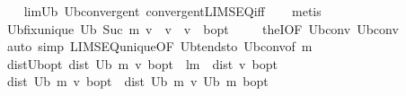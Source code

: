 \begin{isabellebody}
%
\isadelimproof
\ \ %
\endisadelimproof
%
\isatagproof
{}\isamarkupfalse%
\ lim{\isacharunderscore}{\kern0pt}U\isactrlsub b\ U\isactrlsub b{\isacharunderscore}{\kern0pt}convergent\ convergent{\isacharunderscore}{\kern0pt}LIMSEQ{\isacharunderscore}{\kern0pt}iff\isanewline
\ \ \isamarkupfalse%
\ metis%
\endisatagproof
{\isafoldproof}%
%
\isadelimproof
\isanewline
%
\endisadelimproof
\isanewline
{}\isamarkupfalse%
\ U\isactrlsub b{\isacharunderscore}{\kern0pt}fix{\isacharunderscore}{\kern0pt}unique{\isacharcolon}{\kern0pt}\ {\isachardoublequoteopen}U\isactrlsub b\ {\isacharparenleft}{\kern0pt}Suc\ m{\isacharparenright}{\kern0pt}\ v\ {\isacharequal}{\kern0pt}\ v\ {\isasymlongleftrightarrow}\ v\ {\isacharequal}{\kern0pt}\ {\isasymnu}\isactrlsub b{\isacharunderscore}{\kern0pt}opt{\isachardoublequoteclose}\ \isanewline
%
\isadelimproof
\ \ %
\endisadelimproof
%
\isatagproof
{}\isamarkupfalse%
\ theI{\isacharprime}{\kern0pt}{\isacharbrackleft}{\kern0pt}OF\ U\isactrlsub b{\isacharunderscore}{\kern0pt}conv{\isacharparenleft}{\kern0pt}{}{\isacharparenright}{\kern0pt}{\isacharbrackright}{\kern0pt}\ U\isactrlsub b{\isacharunderscore}{\kern0pt}conv{\isacharparenleft}{\kern0pt}{}{\isacharparenright}{\kern0pt}\isanewline
\ \ \isamarkupfalse%
\ {\isacharparenleft}{\kern0pt}auto\ simp{\isacharcolon}{\kern0pt}\ LIMSEQ{\isacharunderscore}{\kern0pt}unique{\isacharbrackleft}{\kern0pt}OF\ U\isactrlsub b{\isacharunderscore}{\kern0pt}tendsto\ U\isactrlsub b{\isacharunderscore}{\kern0pt}conv{\isacharparenleft}{\kern0pt}{}{\isacharparenright}{\kern0pt}{\isacharbrackleft}{\kern0pt}of\ m{\isacharbrackright}{\kern0pt}{\isacharbrackright}{\kern0pt}{\isacharparenright}{\kern0pt}%
\endisatagproof
{\isafoldproof}%
%
\isadelimproof
\isanewline
%
\endisadelimproof
\isanewline
{}\isamarkupfalse%
\ dist{\isacharunderscore}{\kern0pt}U\isactrlsub b{\isacharunderscore}{\kern0pt}opt{\isacharcolon}{\kern0pt}\ {\isachardoublequoteopen}dist\ {\isacharparenleft}{\kern0pt}U\isactrlsub b\ m\ v{\isacharparenright}{\kern0pt}\ {\isasymnu}\isactrlsub b{\isacharunderscore}{\kern0pt}opt\ {\isasymle}\ l{\isacharcircum}{\kern0pt}m\ {\isacharasterisk}{\kern0pt}\ dist\ v\ {\isasymnu}\isactrlsub b{\isacharunderscore}{\kern0pt}opt{\isachardoublequoteclose}\isanewline
%
\isadelimproof
%
\endisadelimproof
%
\isatagproof
{}\isamarkupfalse%
\ {\isacharminus}{\kern0pt}\isanewline
\ \ \isamarkupfalse%
\ {\isachardoublequoteopen}dist\ {\isacharparenleft}{\kern0pt}U\isactrlsub b\ m\ v{\isacharparenright}{\kern0pt}\ {\isasymnu}\isactrlsub b{\isacharunderscore}{\kern0pt}opt\ {\isacharequal}{\kern0pt}\ dist\ {\isacharparenleft}{\kern0pt}U\isactrlsub b\ m\ v{\isacharparenright}{\kern0pt}\ {\isacharparenleft}{\kern0pt}U\isactrlsub b\ m\ {\isasymnu}\isactrlsub b{\isacharunderscore}{\kern0pt}opt{\isacharparenright}{\kern0pt}{\isachardoublequoteclose}\isanewline

\end{isabellebody}

